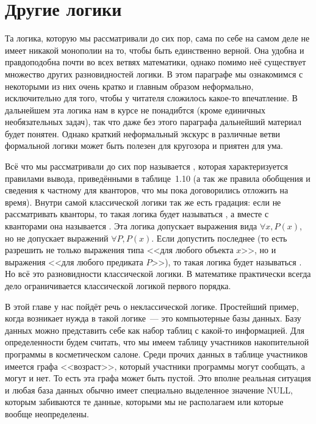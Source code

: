 \section{Другие логики}

Та логика, которую мы рассматривали до сих пор, сама по себе на самом деле не имеет никакой монополии на то, чтобы быть единственно верной. Она удобна и правдоподобна почти во всех ветвях математики, однако помимо неё существует множество других разновидностей логики. В этом параграфе мы ознакомимся с некоторыми из них очень кратко и главным образом неформально, исключительно для того, чтобы у читателя сложилось какое-то впечатление. В дальнейшем эта логика нам в курсе не понадибтся (кроме единичных необязательных задач), так что даже без этого параграфа дальнейший материал будет понятен. Однако краткий неформальный экскурс в различные ветви формальной логики может быть полезен для кругозора и приятен для ума.

Всё что мы рассматривали до сих пор называется , которая характеризуется правилами вывода, приведёнными в таблице~1.10 (а так же правила обобщения и сведения к частному для кванторов, что мы пока договорились отложить на время). Внутри самой классической логики так же есть градация: если не рассматривать кванторы, то такая логика будет называться , а вместе с кванторами она называется . Эта логика допускает выражения вида $\forall x, P(x)$, но не допускает выражений $\forall P, P(x)$. Если допустить последнее (то есть разрешить не только выражения типа <<для любого объекта $x$>>, но и выражения <<для любого предиката $P$>>), то такая логика будет называться . Но всё это разновидности классической логики. В математике практически всегда дело ограничивается классической логикой первого порядка.

В этой главе у нас пойдёт речь о неклассической логике. Простейший пример, когда возникает нужда в такой логике~--- это компьютерные базы данных. Базу данных можно представить себе как набор таблиц с какой-то информацией. Для определенности будем считать, что мы имеем таблицу участников накопительной программы в косметическом салоне. Среди прочих данных в таблице участников имеется графа <<возраст>>, который участники программы могут сообщать, а могут и нет. То есть эта графа может быть пустой. Это вполне реальная ситуация и любая база данных обычно имеет специально выделенное значение NULL, которым забиваются те данные, которыми мы не располагаем или которые вообще неопределены.

